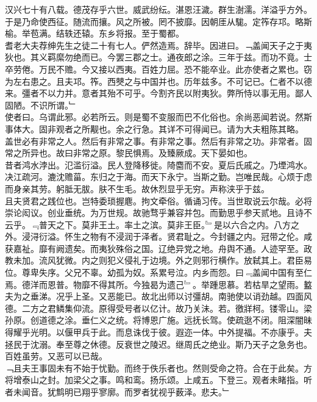 \documentclass{zhvt-classic}
\begin{document}
\hspace*{2em}汉兴七十有八载。德茂存乎六世。威武纷纭。湛恩汪濊。群生澍濡。洋溢乎方外。于是乃命使西征。随流而攘。风之所被。罔不披靡。因朝厓从駹。定筰存邛。略斯榆。举苞满。结轶还辕。东乡将报。至于蜀都。\\
\hspace*{2em}耆老大夫荐绅先生之徒二十有七人。俨然造焉。辞毕。因进曰。﹁盖闻天子之于夷狄也。其义羁縻勿绝而已。今罢三郡之士。通夜郎之涂。三年于兹。而功不竟。士卒劳倦。万民不赡。今又接以西夷。百姓力屈。恐不能卒业。此亦使者之累也。窃为左右患之。且夫邛。筰。西僰之与中国并也。历年兹多。不可记已。仁者不以德来。彊者不以力并。意者其殆不可乎。今割齐民以附夷狄。弊所恃以事无用。鄙人固陋。不识所谓。﹂\\
\hspace*{2em}使者曰。乌谓此邪。必若所云。则是蜀不变服而巴不化俗也。余尚恶闻若说。然斯事体大。固非观者之所觏也。余之行急。其详不可得闻已。请为大夫粗陈其略。\\
\hspace*{2em}盖世必有非常之人。然后有非常之事。有非常之事。然后有非常之功。非常者。固常之所异也。故曰非常之原。黎民惧焉。及臻厥成。天下晏如也。\\
\hspace*{2em}昔者鸿水浡出。氾滥衍溢。民人登降移徙。陭麕而不安。夏后氏戚之。乃堙鸿水。决江疏河。漉沈赡菑。东归之于海。而天下永宁。当斯之勤。岂唯民哉。心烦于虑而身亲其劳。躬胝无胈。肤不生毛。故休烈显乎无穷。声称浃乎于兹。\\
\hspace*{2em}且夫贤君之践位也。岂特委琐握麀。拘文牵俗。循诵习传。当世取说云尔哉。必将崇论闳议。创业垂统。为万世规。故驰骛乎兼容并包。而勤思乎参天贰地。且诗不云乎。﹃普天之下。莫非王土。率土之滨。莫非王臣。﹄是以六合之内。八方之外。浸浔衍溢。怀生之物有不浸润于泽者。贤君耻之。今封疆之内。冠带之伦。咸获嘉祉。靡有阙遗矣。而夷狄殊俗之国。辽绝异党之地。舟舆不通。人迹罕至。政教未加。流风犹微。内之则犯义侵礼于边境。外之则邪行横作。放弑其上。君臣易位。尊卑失序。父兄不辜。幼孤为奴。系累号泣。内乡而怨。曰﹃盖闻中国有至仁焉。德洋而恩普。物靡不得其所。今独曷为遗己﹄。举踵思慕。若枯旱之望雨。盭夫为之垂涕。况乎上圣。又恶能已。故北出师以讨彊胡。南驰使以诮劲越。四面风德。二方之君鳞集仰流。原得受号者以亿计。故乃关沬。若。徼牂柯。镂零山。梁孙原。创道德之涂。垂仁义之统。将博恩广施。远抚长驾。使疏逖不闭。阻深闇昧得耀乎光明。以偃甲兵于此。而息诛伐于彼。遐迩一体。中外提福。不亦康乎。夫拯民于沈溺。奉至尊之休德。反衰世之陵迟。继周氏之绝业。斯乃天子之急务也。百姓虽劳。又恶可以已哉。\\
\hspace*{2em}﹁且夫王事固未有不始于忧勤。而终于佚乐者也。然则受命之符。合在于此矣。方将增泰山之封。加梁父之事。鸣和鸾。扬乐颂。上咸五。下登三。观者未睹指。听者未闻音。犹鹪明已翔乎寥廓。而罗者犹视乎薮泽。悲夫。﹂\\
\end{document}
